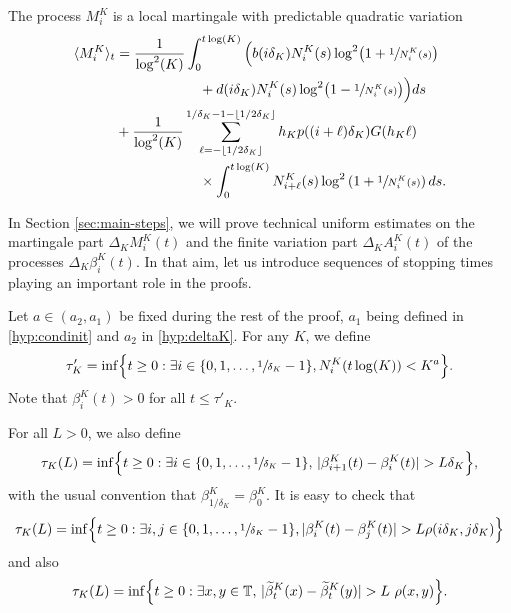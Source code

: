 \documentclass[JEP,XML,SOM,Unicode,published]{cedram}
\let\sep:
\theoremstyle{plain}
\theoremstyle{remark}
\newcommand\T{\mathbb{T}}
\begin{document}
The process $M^K_{i}$ is a local martingale with predictable quadratic variation
\begin{align}
\langle M^K_{i}\rangle_{t}& = \frac{1}{\log^2(K)}\int_{0}^{t\log(K)}\Big(b(i \delta_{K})N^K_{i}(s)\log^2\bigl(1+\sfrac{1}{N^K_{i}(s)}\bigr) \label{def:M}\\
& \qquad\qquad\qquad + d(i \delta_{K})N^K_{i}(s)\log^2\bigl(1-\sfrac{1}{N^K_{i}(s)}\bigr)\Big) ds \\
& +\frac{1}{\log^2(K)}\sum_{\ell=-\lfloor 1/2\delta_K\rfloor}^{1/\delta_K-1-\lfloor 1/2\delta_K\rfloor}
h_{K} p((i+\ell) \delta_{K}) G(h_{K}\ell)\\
& \qquad \qquad \qquad \times \int_{0}^{t\log(K)}N^K_{i+\ell}(s)\log^2\left(1+\sfrac{1}{N^K_{i}(s)}\right) ds.
\end{align}

In Section \ref{sec:main-steps}, we will prove technical uniform estimates on the martingale part $\Delta_K M^K_{i}(t)$ and the finite variation part $\Delta_K A^K_{i}(t)$ of the processes $\Delta_K\beta^K_{i}(t)$. In that aim, let us introduce sequences of stopping times playing an important role in the proofs.

Let $a\in(a_2,a_1)$ be fixed during the rest of the proof, $a_1$ being defined in \eqref{hyp:condinit} and $a_2$ in \eqref{hyp:deltaK}. For any $K$, we define
\begin{equation}
\label{theta}
\tau'_{K} = \inf\Bigl\{t\ge 0\sep \exists i \in \{0, 1,\dots, \sfrac{1}{\delta_K}-1\}, N^K_i(t\log(K)) < K^a\Bigr\}.
\end{equation}
Note that $\beta^K_{i}(t)>0$ for all $t\le\tau'_K$.

For all $L>0$, we also define
\begin{equation} \label{def:tau}
\tau_K(L)=\inf\Bigl\{t\geq 0\sep\exists i\in \{0, 1,\dots, \sfrac{1}{\delta_K}-1\},\,|\beta^K_{i+1}(t)-\beta^K_i(t)|>L\delta_K \Bigr\},
\end{equation}with the usual convention that $\beta^K_{1/\delta_K}=\beta^K_0$.
It is easy to check that
\[
\tau_K(L)=\inf\Bigl\{t\geq 0:\exists i,j\in \{0, 1,\dots, \sfrac{1}{\delta_K}-1\},
|\beta^K_{i}(t)-\beta^K_j(t)|>L\rho(i\delta_K,j\delta_K) \Bigr\}
\]
and also
\begin{equation} \label{def:tau2}
\tau_K(L)=\inf\Bigl\{t\geq 0:\exists x,y\in \T,\,|\widetilde{\beta}^K_{t}(x)-\widetilde{\beta}^K_t(y)|>L\ \rho(x,y) \Bigr\}.
\end{equation}
\end{document}
